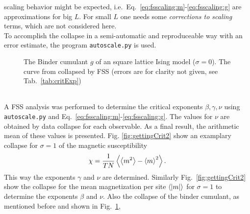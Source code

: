     scaling behavior might be expected, i.e.\ Eq.\ \eqref{eq:fsscaling:m}-\eqref{eq:fsscaling:g}
    are approximations for big \(L\). For small \(L\) one needs some
    \emph{corrections to scaling} terms, which are not considered here.\\
    To accomplish the collapse in a semi-automatic and reproduceable
    way with an error estimate, the program
    \texttt{autoscale.py} \cite{autoscale2009} is used.
    \begin{figure}[htbp]
        \centering
        \caption[Examples of Determining Critical Temperature and Exponents]
        {
             The Binder cumulant \(g\)
                of an square lattice Ising model (\(\sigma=0\)).
             The curve from 
                collapsed by FSS (errors are for clarity
                not given, see Tab.\ \ref{tab:critExp})
        }
        \label{fig:gettingCrit}
    \end{figure}\\
    A FSS analysis was
    performed to determine the critical exponents \(\beta, \gamma, \nu\)
    using \texttt{autoscale.py} \cite{autoscale2009} and Eq.\ \eqref{eq:fsscaling:m}-\eqref{eq:fsscaling:g}.
    The values for \(\nu\) are obtained by data collapse for each observable.
    As a final result, the arithmetic mean of these values is presented.
    Fig. \ref{fig:gettingCrit2}
    show an examplary collapse for \(\sigma=1\) of the magnetic susceptibility
    \begin{equation}
        \chi = \frac{1}{TN}\left< \left< m^2 \right> - \left< m \right>^2 \right>.
    \end{equation}
    This way the exponents \(\gamma\) and \(\nu\) are determined.
    Similarly Fig.\ \ref{fig:gettingCrit2}
    show the collapse for the mean magnetization per site \(\left< \left\vert m\right\vert \right>\) for \(\sigma=1\)
    to determine the exponents \(\beta\) and \(\nu\).
    Also the collapse of the binder cumulant, as mentioned before and shown
    in Fig.\ \ref{fig:gettingCrit},
